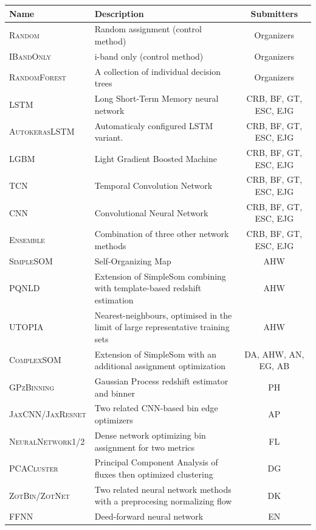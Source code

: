 \documentclass[twocolumn,twocolappendix]{aastex63}
\begin{document}
\begin{table}[]
	\begin{tabular}{|l|p{8cm}|c|}
	\hline
	\textbf{Name} & \textbf{Description} & \textbf{Submitters} \\
	\hline
	\textsc{Random} & Random assignment (control method)  & Organizers \\
	\textsc{IBandOnly} & i-band only (control method)  & Organizers \\
	\textsc{RandomForest} & A collection of individual decision trees & Organizers \\
	\textsc{LSTM} & Long Short-Term Memory neural network & CRB, BF, GT, ESC, EJG \\
	\textsc{AutokerasLSTM}\tablenotemark{a} & Automaticaly configured LSTM variant. & CRB, BF, GT, ESC, EJG \\
	\textsc{LGBM} & Light Gradient Boosted Machine & CRB, BF, GT, ESC, EJG \\
	\textsc{TCN} & Temporal Convolution Network & CRB, BF, GT, ESC, EJG \\
	\textsc{CNN} & Convolutional Neural Network & CRB, BF, GT, ESC, EJG \\
	\textsc{Ensemble} & Combination of three other network methods & CRB, BF, GT, ESC, EJG \\
	\textsc{SimpleSOM} & Self-Organizing Map & AHW \\
	\textsc{PQNLD} & Extension of {\sc SimpleSom} combining with template-based redshift estimation & AHW \\
	\textsc{UTOPIA} & Nearest-neighbours, optimised in the limit of large representative training sets & AHW \\
	\textsc{ComplexSOM} & Extension of {\sc SimpleSom} with an additional assignment optimization & DA, AHW, AN, EG, AB \\
	\textsc{GPzBinning} & Gaussian Process redshift estimator and binner & PH \\
	\textsc{JaxCNN/JaxResnet} & Two related CNN-based bin edge optimizers & AP \\
	\textsc{NeuralNetwork1/2} & Dense network optimizing bin assignment for two metrics & FL \\
	\textsc{PCACluster} & Principal Component Analysis of fluxes then optimized clustering & DG \\
	\textsc{ZotBin/ZotNet} & Two related neural network methods with a preprocesing normalizing flow & DK \\
	\textsc{FFNN} & Deed-forward neural network & EN \\

\end{tabular}
\end{table}
\end{document}
